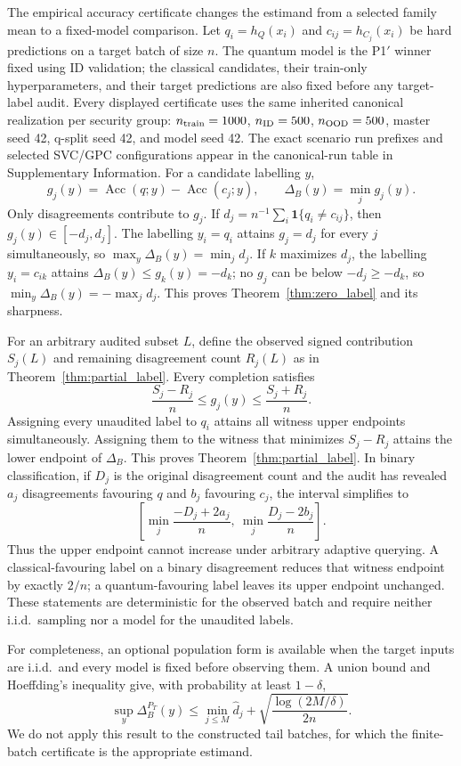 \documentclass[referee,lineno,pdflatex,sn-nature]{sn-jnl}
\theoremstyle{thmstyleone}%
\theoremstyle{thmstyletwo}%
\theoremstyle{thmstylethree}%
\begin{document}
The empirical accuracy certificate changes the estimand from a selected family mean to a fixed-model comparison. Let $q_i=h_Q(x_i)$ and $c_{ij}=h_{C_j}(x_i)$ be hard predictions on a target batch of size $n$. The quantum model is the P1$'$ winner fixed using ID validation; the classical candidates, their train-only hyperparameters, and their target predictions are also fixed before any target-label audit. Every displayed certificate uses the same inherited canonical realization per security group: $n_{\rm train}=1000$, $n_{\rm ID}=500$, $n_{\rm OOD}=500$, master seed 42, q-split seed 42, and model seed 42. The exact scenario run prefixes and selected SVC/GPC configurations appear in the canonical-run table in Supplementary Information. For a candidate labelling $y$,
\[
g_j(y)=\operatorname{Acc}(q;y)-\operatorname{Acc}(c_j;y),
\qquad
\Delta_B(y)=\min_j g_j(y).
\]
Only disagreements contribute to $g_j$. If $d_j=n^{-1}\sum_i\mathbf 1\{q_i\neq c_{ij}\}$, then $g_j(y)\in[-d_j,d_j]$. The labelling $y_i=q_i$ attains $g_j=d_j$ for every $j$ simultaneously, so $\max_y\Delta_B(y)=\min_jd_j$. If $k$ maximizes $d_j$, the labelling $y_i=c_{ik}$ attains $\Delta_B(y)\leq g_k(y)=-d_k$; no $g_j$ can be below $-d_j\geq-d_k$, so $\min_y\Delta_B(y)=-\max_jd_j$. This proves Theorem~\ref{thm:zero_label} and its sharpness.

For an arbitrary audited subset $L$, define the observed signed contribution $S_j(L)$ and remaining disagreement count $R_j(L)$ as in Theorem~\ref{thm:partial_label}. Every completion satisfies
\[
\frac{S_j-R_j}{n}\leq g_j(y)\leq\frac{S_j+R_j}{n}.
\]
Assigning every unaudited label to $q_i$ attains all witness upper endpoints simultaneously. Assigning them to the witness that minimizes $S_j-R_j$ attains the lower endpoint of $\Delta_B$. This proves Theorem~\ref{thm:partial_label}. In binary classification, if $D_j$ is the original disagreement count and the audit has revealed $a_j$ disagreements favouring $q$ and $b_j$ favouring $c_j$, the interval simplifies to
\[
\left[
\min_j\frac{-D_j+2a_j}{n},\
\min_j\frac{D_j-2b_j}{n}
\right].
\]
Thus the upper endpoint cannot increase under arbitrary adaptive querying. A classical-favouring label on a binary disagreement reduces that witness endpoint by exactly $2/n$; a quantum-favouring label leaves its upper endpoint unchanged. These statements are deterministic for the observed batch and require neither i.i.d.\ sampling nor a model for the unaudited labels.

For completeness, an optional population form is available when the target inputs are i.i.d.\ and every model is fixed before observing them. A union bound and Hoeffding's inequality give, with probability at least $1-\delta$,
\[
\sup_y\Delta_B^{P_T}(y)
\leq \min_{j\leq M}\widehat d_j+
\sqrt{\frac{\log(2M/\delta)}{2n}}.
\]
We do not apply this result to the constructed tail batches, for which the finite-batch certificate is the appropriate estimand.
\end{document}
